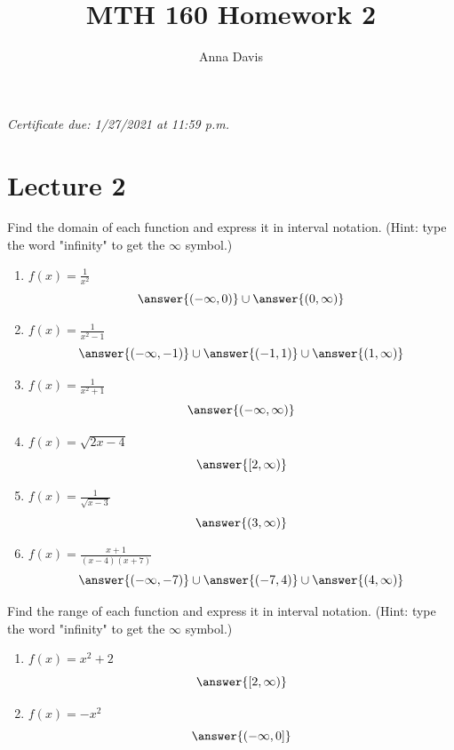 \documentclass{ximera}
\author{Anna Davis} \title{MTH 160 Homework 2}
\begin{document}
\begin{abstract}

\end{abstract}
\maketitle
 \textit{Certificate due: 1/27/2021 at 11:59 p.m.}
 \section{Lecture 2}
\begin{problem}\label{prob:160hom2prob1}
Find the domain of each function and express it in interval notation.  (Hint: type the word "infinity" to get the $\infty$ symbol.)
\begin{enumerate}
    \item $f(x)=\frac{1}{x^2}$
    $$\answer{(-\infty,0)}\cup\answer{(0,\infty)}$$
    \item $f(x)=\frac{1}{x^2-1}$
    $$\answer{(-\infty,-1)}\cup\answer{(-1,1)}\cup\answer{(1,\infty)}$$
    \item $f(x)=\frac{1}{x^2+1}$
    $$\answer{(-\infty,\infty)}$$
    \item $f(x)=\sqrt{2x-4}$
    $$\answer{[2,\infty)}$$
     \item $f(x)=\frac{1}{\sqrt{x-3}}$
    $$\answer{(3,\infty)}$$
    \item $f(x)=\frac{x+1}{(x-4)(x+7)}$
    $$\answer{(-\infty,-7)}\cup\answer{(-7,4)}\cup\answer{(4,\infty)}$$
\end{enumerate}
\end{problem}

\begin{problem}\label{prob:160hom2prob2}
  Find the range of each function and express it in interval notation.  (Hint: type the word "infinity" to get the $\infty$ symbol.)
  \begin{enumerate}
      \item $f(x)=x^2+2$
      $$\answer{[2,\infty)}$$
      \item $f(x)=-x^2$
      $$\answer{(-\infty,0]}$$
  \end{enumerate}
\end{problem}
\end{document}
